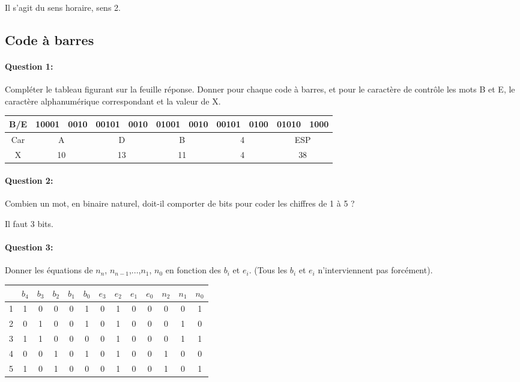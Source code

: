Il s'agit du sens horaire, sens 2.

\subsection{Code à barres}

\paragraph{Question 1:} Compléter le tableau figurant sur la feuille réponse. Donner pour chaque code à barres, et pour le caractère de contrôle les mots B et E, le caractère alphanumérique correspondant et la valeur de X. 

\begin{center}
\begin{tabular}{|c|c|c|c|c|c|c|c|c|c|c|}
\hline
B/E & 10001 & 0010 & 00101 & 0010 & 01001 & 0010 & 00101 & 0100 & 01010 & 1000 \\
\hline
Car & \multicolumn{2}{c|}{A} & \multicolumn{2}{c|}{D} & \multicolumn{2}{c|}{B} & \multicolumn{2}{c|}{4} & \multicolumn{2}{c|}{ESP} \\
\hline
X & \multicolumn{2}{c|}{10} & \multicolumn{2}{c|}{13} & \multicolumn{2}{c|}{11} & \multicolumn{2}{c|}{4} & \multicolumn{2}{c|}{38} \\
\hline
\end{tabular}
\end{center}

\paragraph{Question 2:} Combien un mot, en binaire naturel, doit-il comporter de bits pour coder les chiffres de 1 à 5 ? 

Il faut 3 bits.

\paragraph{Question 3:} Donner les équations de $n_n$, $n_{n-1}$,...,$n_1$, $n_0$ en fonction des $b_i$ et $e_i$. (Tous les $b_i$ et $e_i$ n'interviennent pas forcément). 

\begin{center}
\begin{tabular}{|c|c|c|c|c|c|c|c|c|c||c|c|c|}
\hline
 & $b_4$ & $b_3$ & $b_2$ & $b_1$ & $b_0$ & $e_3$ & $e_2$ & $e_1$ & $e_0$ & $n_2$ & $n_1$ & $n_0$ \\
\hline
1 & 1 & 0 & 0 & 0 & 1 & 0 & 1 & 0 & 0 & 0 & 0 & 1\\
\hline
2 & 0 & 1 & 0 & 0 & 1 & 0 & 1 & 0 & 0 & 0 & 1 & 0\\
\hline
3 & 1 & 1 & 0 & 0 & 0 & 0 & 1 & 0 & 0 & 0 & 1 & 1\\
\hline
4 & 0 & 0 & 1 & 0 & 1 & 0 & 1 & 0 & 0 & 1 & 0 & 0\\
\hline
5 & 1 & 0 & 1 & 0 & 0 & 0 & 1 & 0 & 0 & 1 & 0 & 1 \\
\hline
\end{tabular}
\end{center}


